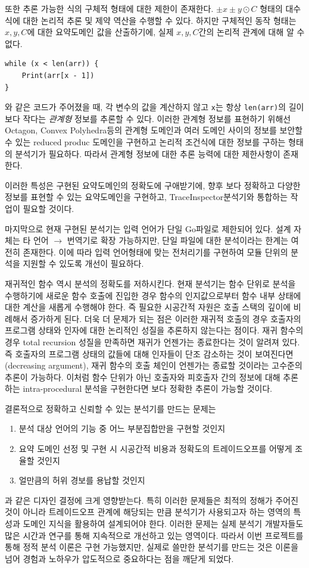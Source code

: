 \documentclass[a4paper,12pt]{article}
\newcommand{\imp}{\textsf{Imp}}
\newcommand{\traceinspector}{\textsf{TraceInspector}}
\begin{document}
또한 추론 가능한 식의 구체적 형태에 대한 제한이 존재한다.  $\pm x \pm y \odot C$ 형태의 대수식에 대한 논리적 추론 및 제약 역산을 수행할 수 있다.
하지만 구체적인 동작 형태는 $x, y, C$에 대한 요약도메인 값을 산출하기에, 실제 $x, y, C$간의 논리적 관계에 대해 알 수 없다.
\begin{lstlisting}
while (x < len(arr)) {
    Print(arr[x - 1])
}
\end{lstlisting}
와 같은 코드가 주어졌을 때, 각 변수의 값을 계산하지 않고 \verb|x|는 항상 \verb|len(arr)|의 길이보다 작다는 \textit{관계형} 정보를 추론할 수 있다.
이러한 관계형 정보를 표현하기 위해선 Octagon\cite{mine2006}, Convex Polyhedra등의 관계형 도메인과 여러 도메인 사이의 정보를 보안할 수 있는 reduced produc 도메인\cite{cousot2011}을 구현하고 논리적 조건식에 대한 정보를 구하는 형태의 분석기가 필요하다.
따라서  관계형 정보에 대한 추론 능력에 대한 제한사항이 존재한다.

이러한 특성은 구현된 요약도메인의 정확도에 구애받기에, 향후 보다 정확하고 다양한 정보를 표현할 수 있는 요약도메인을 구현하고, \traceinspector 분석기와 통합하는 작업이 필요할 것이다.

마지막으로 현재 구현된 분석기는 입력 언어가 단일 Go파일로 제한되어 있다. 설계 자체는 타 언어 $\rightarrow$  번역기로 확장 가능하지만, 단일 파일에 대한
분석이라는 한계는 여전히 존재한다. 이에 따라 입력 언어형태에 맞는 전처리기를 구현하여 모듈 단위의 분석을 지원할 수 있도록 개선이 필요하다.

재귀적인 함수 역시 분석의 정확도를 저하시킨다. 현재 분석기는 함수 단위로 분석을 수행하기에 새로운 함수 호출에 진입한 경우 함수의 인지값으로부터 함수 내부 상태에 대한 계산을 새롭게 수행해야 한다.
즉 필요한 시공간적 자원은 호출 스택의 깊이에 비례해서 증가하게 된다. 더욱 더 문제가 되는 점은 이러한 재귀적 호출의 경우 호출자의 프로그램 상태와 인자에 대한 논리적인 성질을 추론하지 않는다는 점이다.
재귀 함수의 경우 total recursion 성질을 만족하면 재귀가 언젠가는 종료한다는 것이 알려져 있다. 즉 호출자의 프로그램 상태의 값들에 대해 인자들이 단조 감소하는 것이 보여진다면(decreasing argument),
재귀 함수의 호출 체인이 언젠가는 종료할 것이라는 고수준의 추론이 가능하다. 이처럼 함수 단위가 아닌 호출자와 피호출자 간의 정보에 대해 추론하는 intra-procedural 분석을 구현한다면 보다 정확한 추론이 가능할 것이다.

결론적으로 정확하고 신뢰할 수 있는 분석기를 만드는 문제는 
\begin{enumerate}
    \item 분석 대상 언어의 기능 중 어느 부분집합만을 구현할 것인지
    \item 요약 도메인 선정 및 구현 시 시공간적 비용과 정확도의 트레이드오프를 어떻게 조율할 것인지
    \item 얼만큼의 허위 경보를 용납할 것인지
\end{enumerate}
과 같은 디자인 결정에 크게 영향받는다. 특히 이러한 문제들은 최적의 정해가 주어진 것이 아니라 트레이드오프 관계에 해당되는 만큼 분석기가 사용되고자 하는 영역의 특성과 도메인 지식을 활용하여 
설계되어야 한다. 이러한 문제는 실제 분석기 개발자들도 많은 시간과 연구를 통해 지속적으로 개선하고 있는 영역이다. 
따라서 이번 프로젝트를 통해 정적 분석 이론은 구현 가능했지만, 실제로 쓸만한 분석기를 만드는 것은 이론을 넘어 경험과 노하우가 압도적으로 중요하다는 점을 깨닫게 되었다.
\end{document}
